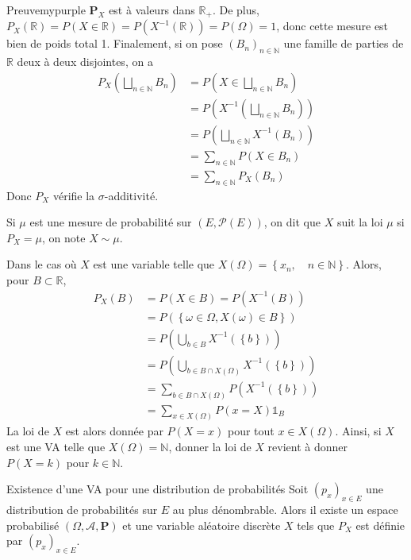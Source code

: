     \begin{demo}{Preuve}{mypurple}
        $\mathbf{P}_X$ est à valeurs dans $\mathbb{R}_+$. De plus, $P_X(\mathbb{R}) = P(X \in \mathbb{R}) = P(X^{-1}(\mathbb{R})) = P(\Omega) = 1$, donc cette mesure est bien de poids total 1. Finalement, si on pose $(B_n)_{n \in \mathbb{N}}$ une famille de parties de $\mathbb{R}$ deux à deux disjointes, on a 
        \begin{align*}
            P_X\left(\bigsqcup_{n \in \mathbb{N}} B_n\right) &= P\left(X \in \bigsqcup_{n \in \mathbb{N}} B_n\right) \\
            &= P\left(X^{-1}\left(\bigsqcup_{n \in \mathbb{N}} B_n\right)\right) \\
            &= P\left(\bigsqcup_{n \in \mathbb{N}} X^{-1}(B_n)  \right) \\
            &= \sum_{n \in \mathbb{N}} P(X \in B_n) \\
            &= \sum_{n \in \mathbb{N}} P_X(B_n)
        \end{align*}
        Donc $P_X$ vérifie la $\sigma$-additivité.
    \end{demo}

    Si $\mu$ est une mesure de probabilité sur $(E, \mathcal{P}(E))$, on dit que $X$ suit la loi $\mu$ si $P_X = \mu$, on note $X \sim \mu$.

    Dans le cas où $X$ est une variable telle que $X(\Omega) = \left\{x_n, \quad n \in \mathbb{N}\right\}$. Alors, pour $B \subset \mathbb{R}$, 
    \begin{align*}
        P_X(B) &= P(X \in B) = P(X^{-1}(B)) \\
        &= P\left(\left\{\omega \in \Omega, X(\omega) \in B\right\}\right) \\
        &= P\left(\bigcup_{b \in B} X^{-1}(\left\{b\right\})\right) \\
        &= P\left(\bigcup_{b \in B \cap X(\Omega)} X^{-1}(\left\{b\right\})\right) \\
        &= \sum_{b \in B \cap X(\Omega)} P(X^{-1}(\left\{b\right\})) \\
        &= \sum_{x \in X(\Omega)} P(x = X) \mathbb{1}_B 
    \end{align*}
    La loi de $X$ est alors donnée par $P(X = x)$ pour tout $x \in X(\Omega)$. Ainsi, si $X$ est une VA telle que $X(\Omega) = \mathbb{N}$, donner la loi de $X$ revient à donner $P(X = k)$ pour $k \in \mathbb{N}$.

    \begin{theo}{Existence d’une VA pour une distribution de probabilités}
        Soit $(p_x)_{x \in E}$ une distribution de probabilités sur $E$ au plus dénombrable. Alors il existe un espace probabilisé $(\Omega, \mathcal{A}, \mathbf{P})$ et une variable aléatoire discrète $X$ tels que $P_X$ est définie par $(p_x)_{x \in E}$.
    \end{theo}

